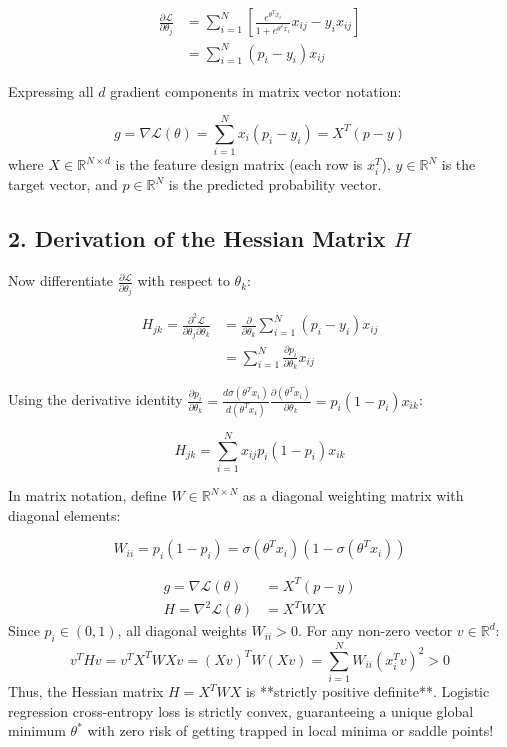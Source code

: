 \begin{align}
\frac{\partial \mathcal{L}}{\partial \theta_j} &= \sum_{i=1}^N \left[ \frac{e^{\theta^T x_i}}{1 + e^{\theta^T x_i}} x_{ij} - y_i x_{ij} \right] \\
&= \sum_{i=1}^N (p_i - y_i) x_{ij}
\end{align}

Expressing all $d$ gradient components in matrix vector notation:

\begin{equation}
g = \nabla \mathcal{L}(\theta) = \sum_{i=1}^N x_i (p_i - y_i) = X^T (p - y)
\end{equation}
where $X \in \mathbb{R}^{N \times d}$ is the feature design matrix (each row is $x_i^T$), $y \in \mathbb{R}^N$ is the target vector, and $p \in \mathbb{R}^N$ is the predicted probability vector.

\subsection{2. Derivation of the Hessian Matrix $H$}
Now differentiate $\frac{\partial \mathcal{L}}{\partial \theta_j}$ with respect to $\theta_k$:

\begin{align}
H_{jk} = \frac{\partial^2 \mathcal{L}}{\partial \theta_j \partial \theta_k} &= \frac{\partial}{\partial \theta_k} \sum_{i=1}^N (p_i - y_i) x_{ij} \\
&= \sum_{i=1}^N \frac{\partial p_i}{\partial \theta_k} x_{ij}
\end{align}

Using the derivative identity $\frac{\partial p_i}{\partial \theta_k} = \frac{d \sigma(\theta^T x_i)}{d(\theta^T x_i)} \frac{\partial(\theta^T x_i)}{\partial \theta_k} = p_i (1 - p_i) x_{ik}$:

\begin{equation}
H_{jk} = \sum_{i=1}^N x_{ij} p_i (1 - p_i) x_{ik}
\end{equation}

In matrix notation, define $W \in \mathbb{R}^{N \times N}$ as a diagonal weighting matrix with diagonal elements:

\begin{equation}
W_{ii} = p_i (1 - p_i) = \sigma(\theta^T x_i) (1 - \sigma(\theta^T x_i))
\end{equation}

\begin{mathbox}
\begin{align}
g = \nabla \mathcal{L}(\theta) &= X^T (p - y) \\
H = \nabla^2 \mathcal{L}(\theta) &= X^T W X
\end{align}
Since $p_i \in (0, 1)$, all diagonal weights $W_{ii} > 0$. For any non-zero vector $v \in \mathbb{R}^d$:
$$v^T H v = v^T X^T W X v = (X v)^T W (X v) = \sum_{i=1}^N W_{ii} (x_i^T v)^2 > 0$$
Thus, the Hessian matrix $H = X^T W X$ is **strictly positive definite**. Logistic regression cross-entropy loss is strictly convex, guaranteeing a unique global minimum $\theta^*$ with zero risk of getting trapped in local minima or saddle points!
\end{mathbox}



